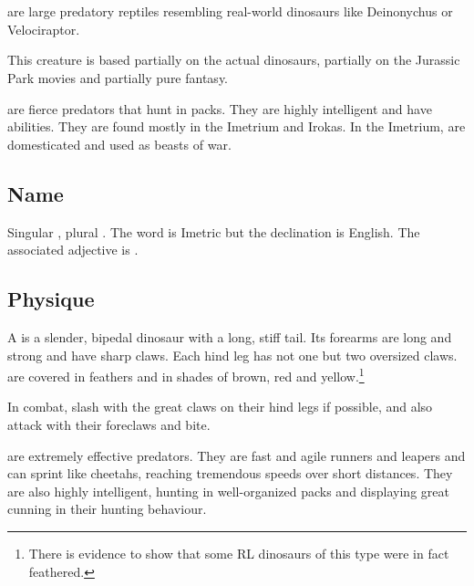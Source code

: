 \section[Nycan]{\Nycan}
\index{\nycan}
\Nycans{} are large predatory reptiles resembling real-world dinosaurs like Deinonychus or Velociraptor. 

This creature is based partially on the actual dinosaurs, partially on the Jurassic Park movies and partially pure fantasy. 

\Nycans{} are fierce predators that hunt in packs. 
They are highly intelligent and have  abilities. 
They are found mostly in the Imetrium and Irokas. 
In the Imetrium, \nycans{} are domesticated and used as beasts of war. 









\subsection{Name}
Singular \emph{\nycan{}}, plural \emph{\nycans{}}. 
The word is Imetric but the declination is English. 
The associated adjective is \emph{\nycan{}}. 









\subsection{Physique}
A \nycan{} is a slender, bipedal dinosaur with a long, stiff tail. Its forearms are long and strong and have sharp claws. Each hind leg has not one but two oversized claws. \Nycans{} are covered in feathers and \coloured in shades of brown, red and yellow.\footnote{There is evidence to show that some RL dinosaurs of this type were in fact feathered.} 

In combat, \nycans{} slash with the great claws on their hind legs if possible, and also attack with their foreclaws and bite. 

\Nycans{} are extremely effective predators. They are fast and agile runners and leapers and can sprint like cheetahs, reaching tremendous speeds over short distances. They are also highly intelligent, hunting in well-organized packs and displaying great cunning in their hunting behaviour. 


